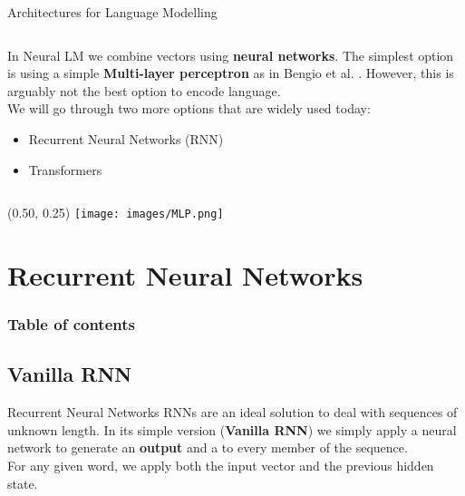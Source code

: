 \documentclass[UKenglish]{beamer}
\begin{document}
\begin{frame}{Architectures for Language Modelling}
\vspace{0.3cm}\\
\begin{columns}[onlytextwidth]
    \begin{column}{0.50\textwidth}
    In Neural LM we combine vectors using \textbf{neural networks}. The simplest option is using a simple \textbf{Multi-layer perceptron} as in Bengio et al. \cite{bengio}. %
    However, this is arguably not the best option to encode language.
    \vspace{0.2cm}\\ We will go through two more options that are widely used today:
    \begin{itemize}
        \item Recurrent Neural Networks (RNN)
        \item Transformers
    \end{itemize}
    \end{column}
\end{columns}
\begin{textblock}{0.5}(0.50, 0.25)
        \texttt{[image: images/MLP.png]}
\end{textblock}
\end{frame}

\section{Recurrent Neural Networks}
\begin{frame}
    \frametitle{Table of contents}
    \tableofcontents[currentsection]
\end{frame}
\subsection{Vanilla RNN}
\begin{frame}{Recurrent Neural Networks}
    RNNs are an ideal solution to deal with sequences of unknown length. In its simple version (\textbf{Vanilla RNN}) we simply apply a neural network to generate an \textbf{output} and a  to every member of the sequence.
    \vspace{4.5cm}\\ For any given word, we apply both the input vector and the previous hidden state.
\end{frame}
\end{document}
